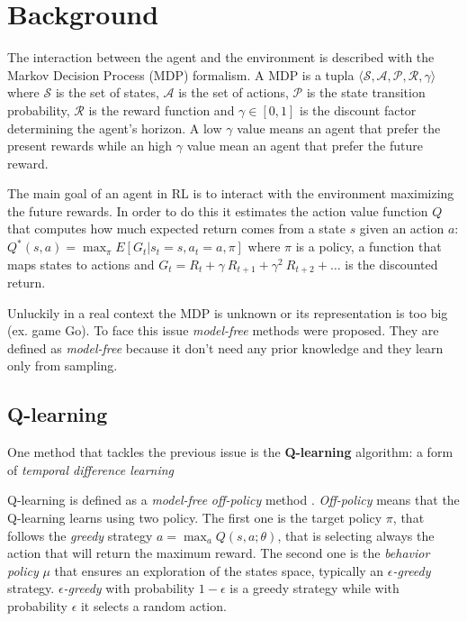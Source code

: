 \section{Background}

The interaction between the agent and the environment is described  with the
Markov Decision Process (MDP) formalism. A MDP is a tupla $\langle \mathcal{S}, 
\mathcal{A}, \mathcal{P}, \mathcal{R}, \gamma \rangle$ where $\mathcal{S}$ is
the set of states, $\mathcal{A}$ is the set of actions, $\mathcal{P}$ is the 
state transition probability, $\mathcal{R}$ is the reward function and 
$\gamma \in [0,1]$ is the discount factor determining the agent's horizon. A low $\gamma$ value means an agent that prefer the present rewards while an high $\gamma$ value mean an agent that prefer the future reward.

The main goal of an agent in RL is to interact with the environment maximizing the future rewards. In order to do this it estimates the action value function $Q$ that computes how much expected return comes from a state $s$ given an action $a$: $Q^*(s, a) = \max_\pi E[ G_t | s_t = s, a_t = a, \pi]$ where $\pi$ is a policy, a function that maps states to actions and $G_t = R_t + \gamma~R_{t+1} + \gamma^2~R_{t+2} + \dots$ is the discounted return.


Unluckily in a real context the MDP is unknown or its representation is too big
(ex. game Go). To face this issue \textit{model-free} methods were proposed. They are defined as \textit{model-free} because it don't need any prior knowledge and they learn only from sampling.

\subsection{Q-learning}

One method that tackles the previous issue is the \textbf{Q-learning} algorithm: a form of \textit{temporal difference learning} \cite{Sutton:1998:IRL:551283}

Q-learning is defined as a \textit{model-free} \textit{off-policy} method \cite{Watkins1992}. \textit{Off-policy} means that the Q-learning learns using two policy. The first one is the target policy $\pi$, that follows the \textit{greedy} strategy $a = \max_a Q(s, a; \theta)$, that is selecting always the action that will return the maximum reward.
The second one is the \textit{behavior policy} $\mu$ that ensures an exploration of the states space, typically an \textit{$\epsilon$-greedy} strategy. \textit{$\epsilon$-greedy} with probability $1 - \epsilon$ is a greedy strategy while with probability $\epsilon$ it selects a random action.

